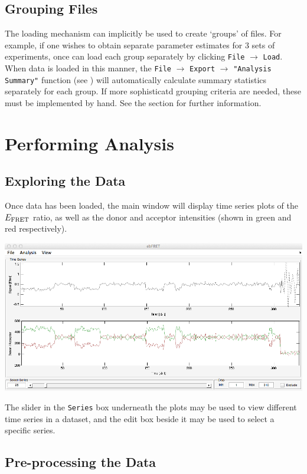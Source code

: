 \documentclass[12pt,article,oldfontcommands]{memoir}
\newcommand{\indt}{\qquad}
\begin{document}
\subsection{Grouping Files}

The loading mechanism can implicitly be used to create `groups' of files. For example, if one wishes to obtain separate parameter estimates for 3 sets of experiments, once can load each group separately by clicking \texttt{File} $\to$ \texttt{Load}. When data is loaded in this manner, the \texttt{File} $\to$ \texttt{Export} $\to$ \texttt{"Analysis Summary"} function (see \emph{}) will automatically calculate summary statistics separately for each group. If more sophisticatd grouping criteria are needed, these must be implemented by hand. See the \emph{} section for further information.

\section{Performing Analysis}

\subsection{Exploring the Data}

Once data has been loaded, the main window will display time series plots of the $E_{\rm FRET}$ ratio, as well as the donor and acceptor intensities (shown in green and red respectively).

\indt\includegraphics[width=5.5in]{images/trace_view}

The slider in the \texttt{Series} box underneath the plots may be used to view different time series in a dataset, and the edit box beside it may be used to select a specific series.

\subsection{Pre-processing the Data}
\end{document}

